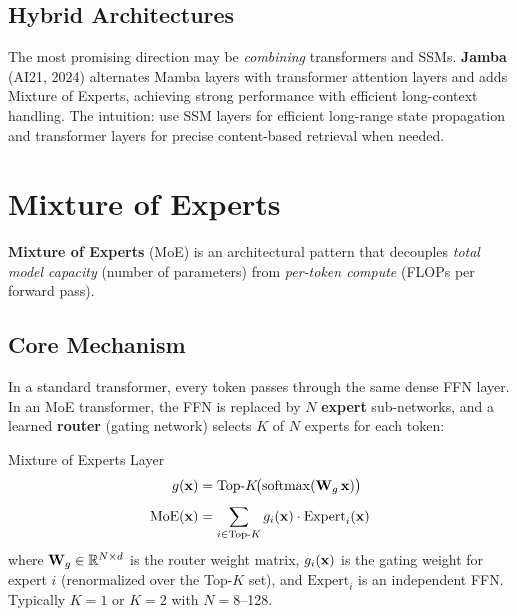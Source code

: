 \subsection{Hybrid Architectures}

The most promising direction may be \emph{combining} transformers and SSMs.
\textbf{Jamba} (AI21, 2024) alternates Mamba layers with transformer
attention layers and adds Mixture of Experts, achieving strong performance
with efficient long-context handling.  The intuition: use SSM layers for
efficient long-range state propagation and transformer layers for precise
content-based retrieval when needed.


\section{Mixture of Experts}
\label{sec:moe}

\textbf{Mixture of Experts} (MoE) is an architectural pattern that decouples
\emph{total model capacity} (number of parameters) from
\emph{per-token compute} (FLOPs per forward pass).

\subsection{Core Mechanism}

In a standard transformer, every token passes through the same dense FFN
layer.  In an MoE transformer, the FFN is replaced by $N$ \textbf{expert}
sub-networks, and a learned \textbf{router} (gating network) selects $K$ of
$N$ experts for each token:

\begin{mathresult}{Mixture of Experts Layer}
\begin{align}
g(\mathbf{x}) &= \text{Top-}K\!\bigl(\operatorname{softmax}(\mathbf{W}_g \,\mathbf{x})\bigr)
\label{eq:moe_gate} \\[4pt]
\text{MoE}(\mathbf{x}) &= \sum_{i \in \text{Top-}K} g_i(\mathbf{x}) \cdot \text{Expert}_i(\mathbf{x})
\label{eq:moe_output}
\end{align}
where $\mathbf{W}_g \in \mathbb{R}^{N \times d}$ is the router weight matrix, $g_i(\mathbf{x})$ is
the gating weight for expert $i$ (renormalized over the Top-$K$ set), and
$\text{Expert}_i$ is an independent FFN.  Typically $K = 1$ or $K = 2$ with
$N = 8$--128.
\end{mathresult}

